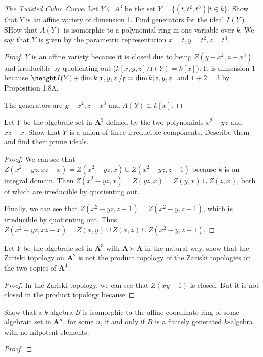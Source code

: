 \documentclass[openany, amssymb, psamsfonts]{amsart}
\begin{document}
\begin{exercise}[1.2]
\textit{The Twisted Cubic Curve}. Let $Y \subseteq A^3  $ be the set $Y = \{(t,t^2,t^3 )|t\in k\}   $. Show that $Y $ is an affine variety of dimension 1. Find generators for the ideal $I(Y) $. SHow that $A(Y) $ is isomorphic to a polynomial ring in one variable over $k $. We say that $Y $ is given by the parametric representation $x=t,y=t^2,z=t^3  $.
\end{exercise}
\begin{proof}
	$Y $ is an affine variety because it is closed due to being $Z(y-x^2,z-x^3) $ and irreducible by quotienting out ($k[x,y,z] / I(Y) = k[x] $).
	It is dimension 1 because $\height I(Y) + \dim k[x,y,z] / \mathfrak{p} = \dim k[x,y,z] $ and $1 + 2 = 3 $ by Proposition 1.8A.

	The generators are $y-x^2,z-x^3  $ and $A(Y) \cong k[x] $.
\end{proof}

\begin{exercise}[1.3]
Let $Y $ be the algebraic set in $\bm{A}^3 $ defined by the two polynomials $x^2-yz $ and $xz-x $. Show that $Y $ is a union of three irreducible components. Describe them and find their prime ideals.
\end{exercise}
\begin{proof}
	We can see that $Z(x^2-yz,xz-x) = Z(x^2-yz,x)\cup Z(x^2-yz,z-1)$ because $k $ is an integral domain.
	Then $Z(x^2-yz,x) = Z(yz,x) = Z(y,x)\cup Z(z,x)$, both of which are irreducible by quotienting out.

	Finally, we can see that $Z(x^2-yz,z-1) = Z(x^2-y,z-1) $, which is irreducible by quotienting out.
	Thus $Z(x^2-yz,xz-x) = Z(x,y)\cup Z(x,z)\cup Z(x^2-y,z-1) $.
\end{proof}

\begin{exercise}[1.4]
Let $Y $ be the algebraic set in $\bm{A}^3$ with $\bm{A}\times \bm{A} $ in the natural way, show that the Zariski topology on $\bm{A}^2$ is not the product topology of the Zariski topologies on the two copies of $\bm{A}^1 $.
\end{exercise}
\begin{proof}
	In the Zariski topology, we can see that $Z(xy-1) $ is closed.
	But it is not closed in the product topology because
\end{proof}

\begin{exercise}[1.5]
Show that a $k $-algebra $B $ is isomorphic to the affine coordinate ring of some algebraic set in $\bm{A}^n$, for some $n $, if and only if $B $ is a finitely generated $k $-algebra with no nilpotent elements.
\end{exercise}
\begin{proof}
	
\end{proof}
\end{document}

